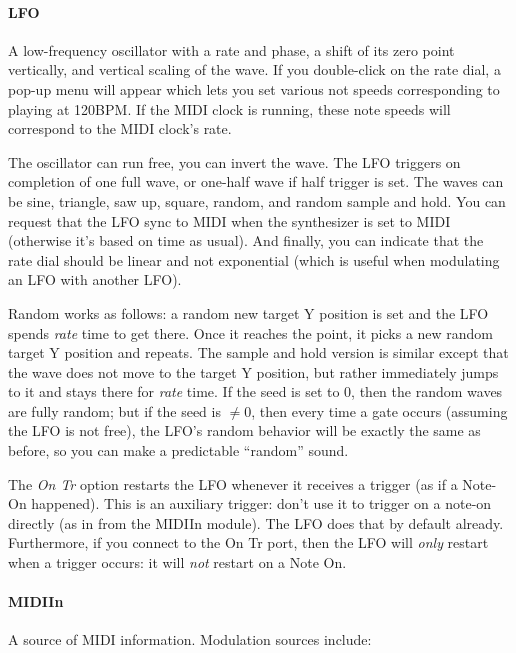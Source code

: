 \documentclass{article}
\begin{document}
\paragraph{LFO}  A low-frequency oscillator with a rate and phase, a shift of its zero point vertically, and vertical scaling of the wave.   If you double-click on the rate dial, a pop-up menu will appear which lets you set various not speeds corresponding to playing at 120BPM.  If the MIDI clock is running, these note speeds will correspond to the MIDI clock's rate.

The oscillator can run free, you can invert the wave.    The LFO triggers on completion of one full wave, or one-half wave if half trigger is set.  The waves can be sine, triangle, saw up, square, random, and random sample and hold.   You can request that the LFO sync to MIDI when the synthesizer is set to MIDI (otherwise it's based on time as usual).  And finally, you can indicate that the rate dial should be linear and not exponential (which is useful when modulating an LFO with another LFO).

Random works as follows: a random new target Y position is set and the LFO spends {\it rate} time to get there.  Once it reaches the point, it picks a new random target Y position and repeats.  The sample and hold version is similar except that the wave does not move to the target Y position, but rather immediately jumps to it and stays there for {\it rate} time.   If the seed is set to 0, then the random waves are fully random; but if the seed is \(\neq 0\), then every time a gate occurs (assuming the LFO is not free), the LFO's random behavior will be exactly the same as before, so you can make a predictable ``random'' sound.

The {\it On Tr} option restarts the LFO whenever it receives a trigger (as if a Note-On happened).  This is an auxiliary trigger: don't use it to trigger on a note-on directly (as in from the MIDIIn module).  The LFO does that by default already.  Furthermore, if you connect to the On Tr port, then the LFO will {\it only} restart when a trigger occurs: it will {\it not} restart on a Note On.

\paragraph{MIDIIn}  A source of MIDI information.  Modulation sources include:
\end{document}
